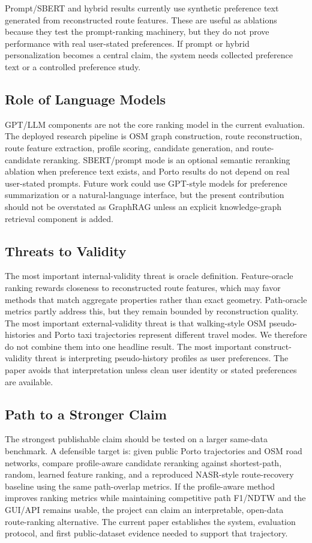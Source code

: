 Prompt/SBERT and hybrid results currently use synthetic preference text generated from reconstructed route features. These are useful as ablations because they test the prompt-ranking machinery, but they do not prove performance with real user-stated preferences. If prompt or hybrid personalization becomes a central claim, the system needs collected preference text or a controlled preference study.

\subsection{Role of Language Models}
GPT/LLM components are not the core ranking model in the current evaluation. The deployed research pipeline is OSM graph construction, route reconstruction, route feature extraction, profile scoring, candidate generation, and route-candidate reranking. SBERT/prompt mode is an optional semantic reranking ablation when preference text exists, and Porto results do not depend on real user-stated prompts. Future work could use GPT-style models for preference summarization or a natural-language interface, but the present contribution should not be overstated as GraphRAG unless an explicit knowledge-graph retrieval component is added.

\subsection{Threats to Validity}
The most important internal-validity threat is oracle definition. Feature-oracle ranking rewards closeness to reconstructed route features, which may favor methods that match aggregate properties rather than exact geometry. Path-oracle metrics partly address this, but they remain bounded by reconstruction quality. The most important external-validity threat is that walking-style OSM pseudo-histories and Porto taxi trajectories represent different travel modes. We therefore do not combine them into one headline result. The most important construct-validity threat is interpreting pseudo-history profiles as user preferences. The paper avoids that interpretation unless clean user identity or stated preferences are available.

\subsection{Path to a Stronger Claim}
The strongest publishable claim should be tested on a larger same-data benchmark. A defensible target is: given public Porto trajectories and OSM road networks, compare profile-aware candidate reranking against shortest-path, random, learned feature ranking, and a reproduced NASR-style route-recovery baseline using the same path-overlap metrics. If the profile-aware method improves ranking metrics while maintaining competitive path F1/NDTW and the GUI/API remains usable, the project can claim an interpretable, open-data route-ranking alternative. The current paper establishes the system, evaluation protocol, and first public-dataset evidence needed to support that trajectory.
